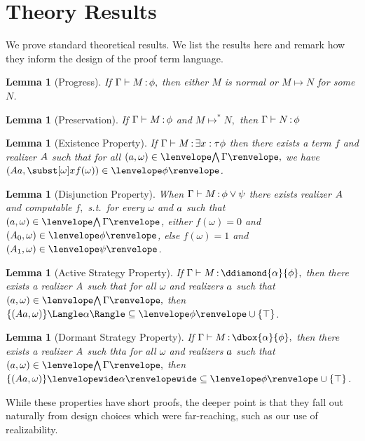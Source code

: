 \documentclass[12pt]{cmuthesis}
\newtheorem{lemma}[theorem]{Lemma}
\theoremstyle{definition}
\theoremstyle{remark}
\newcommand{\stepsto}{\mapsto}
\newcommand{\om}{\omega}
\newcommand{\G}{\Gamma}
\begin{document}
\section{Theory Results}
We prove standard theoretical results.
We list the results here and remark how they inform the design of the proof term language.

\begin{lemma}[Progress]
If $\proves{\Gamma}{M}{\phi},$ then either $M$ is normal or $M \stepsto N$ for some $N$.
\end{lemma}

\begin{lemma}[Preservation]
If $\proves{\Gamma}{M}{\phi}$ and $M \stepsto^* N,$ then $\proves{\Gamma}{N}{\phi}$
\end{lemma}

\begin{lemma}[Existence Property]
If $\proves{\Gamma}{M}{\exists{x:\tau}{\phi}}$ then there exists a term $f$ and realizer $\ab$ such that for all $(\aa,\om) \in \cintR{\G},$
we have 
$(\rzApp{\ab}{\aa},\ssub{\om}{x}{f(\om)}) \in \fintR{\phi}$.
\label{lem:term-ep}
\end{lemma}
\begin{lemma}[Disjunction Property]
When $\proves{\Gamma}{M}{\phi \lor \psi}$ there exists realizer $\ab$ and computable $f,$ s.t.\ for every $\om$ and $\aa$ such that $(\aa,\omega) \in \cintR{\G}$, either $f(\omega)=0$ and $(\rzFst{\ab},\omega) \in \fintR{\phi}{}$, else $f(\omega)=1$ and $(\rzSnd{\ab},\omega) \in \fintR{\psi}$.
\end{lemma}
\begin{lemma}[Active Strategy Property]
If $\proves{\Gamma}{M}{\ddiamond{\alpha}{\phi}},$ then there exists a realizer $\ab$ such that for all $\om$ and realizers $\aa$ such that $(\aa,\om) \in \cintR{\G},$ 
then $\strategyforR[\alpha]{\{(\rzApp{\ab}{\aa},\om)\}} \subseteq \fintR{\phi} \cup \{\stt\}$.
\end{lemma}
\begin{lemma}[Dormant Strategy Property]
If $\proves{\Gamma}{M}{\dbox{\alpha}{\phi}},$ then there exists a realizer $\ab$ such thta for all $\om$ and realizers $\aa$ such that $(\aa,\om) \in \cintR{\G},$ 
then $\dstrategyforR[\alpha]{\{(\rzApp{\ab}{\aa},\om)\}} \subseteq \fintR{\phi} \cup \{\stt\}$.
\end{lemma}
While these properties have short proofs, the deeper point is that they fall out naturally from design choices which were far-reaching, such as our use of realizability.
\end{document}

